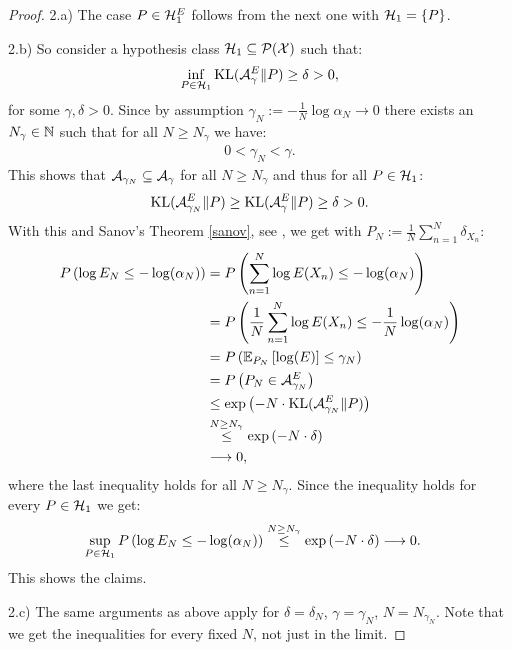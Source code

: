 \begin{Thm}
\begin{proof}
    2.a) The case $P \in \mathcal{H}_1^E$ follows from the next one with $\mathcal{H}_1=\left \{ P \right \}$.

    2.b) So consider a hypothesis class $\mathcal{H}_1 \subseteq \mathcal{P}(\mathcal{X})$ such that:
    \begin{align*}
       \inf_{P \in \mathcal{H}_1} \operatorname{\mathrm{KL}}(\mathcal{A}_\gamma^E \|P) \ge \delta  > 0,
    \end{align*}
    for some  $\gamma,\delta > 0$.
    Since by assumption $\gamma_N:=-\frac{1}{N} \log \alpha_N \to 0$ there exists an $N_\gamma \in \mathbb{N}$ such that for all $N \ge N_\gamma$ we have:
    \begin{align*}
      0 < \gamma_N <  \gamma.
    \end{align*}
    This shows that $\mathcal{A}_{\gamma_N} \subseteq \mathcal{A}_{\gamma}$  for all $N \ge N_\gamma$ and thus for all $P \in \mathcal{H}_1$:
    \begin{align*}
        \operatorname{\mathrm{KL}}(\mathcal{A}_{\gamma_N}^E \|P) \ge  \operatorname{\mathrm{KL}}(\mathcal{A}_\gamma^E \|P) \ge \delta > 0.
    \end{align*}
    With this and Sanov's Theorem \ref{sanov}, see \cite{Csi84,Bal2020}, we get with $P_N := \frac{1}{N} \sum_{n=1}^N \delta_{X_n}$:
    \begin{align*}
        P\left (  \log E_N \le - \log(\alpha_N)  \right ) 
      &=  P\left (   \sum_{n=1}^N  \log E(X_n)  \le - \log(\alpha_N)  \right )  \\
      &=  P\left (   \frac{1}{N}\sum_{n=1}^N  \log E(X_n)  \le - \frac{1}{N} \log(\alpha_N)  \right )  \\
      &=  P\left (  \mathbb{E}_{P_N}\left [ \log(E) \right ] \le \gamma_N  \right )  \\
      &=  P\left ( P_N \in \mathcal{A}^E_{\gamma_N}\right ) \\ 
      &\le \exp\left ( -N \cdot \operatorname{\mathrm{KL}}(\mathcal{A}^E_{\gamma_N}\|P) \right ) \\
      &\stackrel{N\ge N_\gamma}{\le} \exp\left ( -N \cdot \delta \right )\\
      & \longrightarrow 0,
    \end{align*}
    where the last inequality holds for all $N \ge N_\gamma$.
    Since the inequality holds for every $P \in \mathcal{H}_1$ we get:
    \begin{align*}
        \sup_{P \in \mathcal{H}_1}   P\left (  \log E_N \le - \log(\alpha_N)  \right ) 
      &\stackrel{N\ge N_\gamma}{\le} \exp\left ( -N \cdot \delta \right )  \longrightarrow 0.
    \end{align*}
    This shows the claims.

    2.c) The same arguments as above apply for $\delta=\delta_N$, $\gamma=\gamma_N$, $N=N_{\gamma_N}$. Note that we get the inequalities for every fixed $N$, not just in the limit.
 \end{proof}
\end{Thm}

